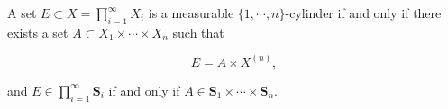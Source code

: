 A set $E \subset X = \prod_{i=1}^{\infty} X_i$ is a measurable $\{1, \cdots, n\}$-cylinder if and only if there exists a set $A \subset X_1 \times \cdots \times X_n$ such that

$$E = A \times X^{(n)},$$

and $E \in \prod_{i=1}^{\infty} \mathbf{S}_i$ if and only if $A \in \mathbf{S}_1 \times \cdots \times \mathbf{S}_n$.
